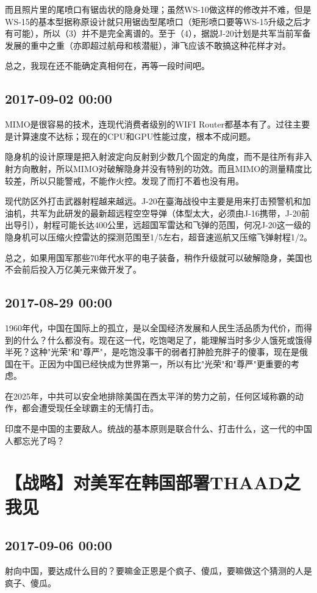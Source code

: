 \documentclass[twocolumn]{ctexart}
\begin{document}
而且照片里的尾喷口有锯齿状的隐身处理；虽然WS-10做这样的修改并不难，但是WS-15的基本型据称原设计就只用锯齿型尾喷口（矩形喷口要等WS-15升级之后才有可能），所以（3）并不是完全离谱的。至于（4），据説J-20计划是共军当前军备发展的重中之重（亦即超过航母和核潜艇），渖飞应该不敢搞这种花样才对。

总之，我现在还不能确定真相何在，再等一段时间吧。\subsection*{2017-09-02 00:00}
MIMO是很容易的技术，连现代消费者级别的WIFI Router都基本有了。过往主要是计算速度不达标；现在的CPU和GPU性能过度，根本不成问题。

隐身机的设计原理是把入射波定向反射到少数几个固定的角度，而不是往所有非入射方向散射，所以MIMO对破解隐身并没有特别的功效。而且MIMO的测量精度比较差，所以只能警戒，不能作火控。发现了而打不着也没有用。

现代防区外打击武器射程越来越远。J-20在臺海战役中主要是用来打击预警机和加油机，共军为此研发的最新超远程空空导弹（体型太大，必须由J-16携带，J-20前出导引），射程可能长达400公里，远超国军雷达和飞弹的范围，何况J-20这一级的隐身机可以压缩火控雷达的探测范围至1/5左右，超音速巡航又压缩飞弹射程1/2。

总之，如果用国军那些70年代水平的电子装备，稍作升级就可以破解隐身，美国也不会前后投入万亿美元来做开发了。\subsection*{2017-08-29 00:00}
1960年代，中国在国际上的孤立，是以全国经济发展和人民生活品质为代价，而得到的什么？什么都没有。现在这一代，吃饱喝足了，能理解当时多少人饿死或饿得半死？这种"光荣"和"尊严"，是吃饱没事干的弱者打肿脸充胖子的傻事，现在是俄国在干。正因为中国已经快成为世界第一，所以有比"光荣"和"尊严"更重要的考虑。

在2025年，中共可以安全地排除美国在西太平洋的势力之前，任何区域称霸的动作，都会遭受现任全球霸主的无情打击。

印度不是中国的主要敌人。统战的基本原则是联合什么、打击什么，这一代的中国人都忘光了吗？\section*{【战略】对美军在韩国部署THAAD之我见}
\subsection*{2017-09-06 00:00}
射向中国，要达成什么目的？要嘛金正恩是个疯子、傻瓜，要嘛做这个猜测的人是疯子、傻瓜。
\end{document}
